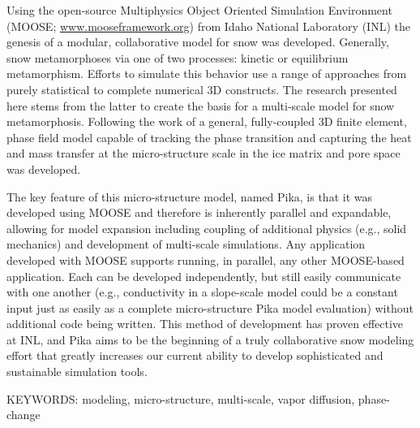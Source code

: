Using the open-source Multiphysics Object Oriented Simulation Environment (MOOSE; \url{www.mooseframework.org}) from Idaho National Laboratory (INL) the genesis of a modular, collaborative model for snow was developed. Generally, snow metamorphoses via one of two processes: kinetic or equilibrium metamorphism. Efforts to simulate this behavior use a range of approaches from purely statistical to complete numerical 3D constructs. The research presented here stems from the latter to create the basis for a multi-scale model for snow metamorphosis. Following the work of \citet{kaempfer2009phase} a general, fully-coupled 3D finite element, phase field model capable of tracking the phase transition and capturing the heat and mass transfer at the micro-structure scale in the ice matrix and pore space was developed.

The key feature of this micro-structure model, named Pika, is that it was developed using MOOSE and therefore is inherently parallel and expandable, allowing for model expansion including coupling of additional physics (e.g., solid mechanics) and development of multi-scale simulations. Any application developed with MOOSE supports running, in parallel, any other MOOSE-based application. Each can be developed independently, but still easily communicate with one another (e.g., conductivity in a slope-scale model could be a constant input just as easily as a complete micro-structure Pika model evaluation) without additional code being written. This method of development has proven effective at INL, and Pika aims to be the beginning of a truly collaborative snow modeling effort that greatly increases our current ability to develop sophisticated and sustainable simulation tools.

\bigskip
\noindent KEYWORDS: modeling, micro-structure, multi-scale, vapor diffusion, phase-change
